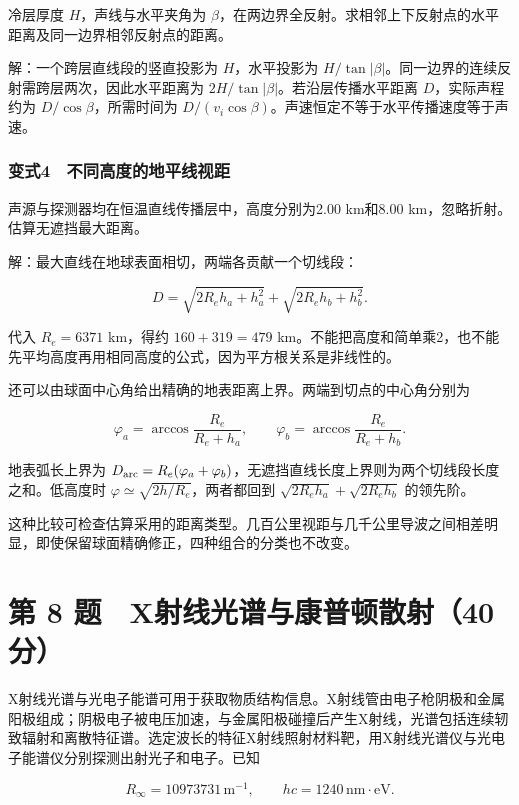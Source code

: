 \documentclass[12pt,a4paper,fontset=fandol]{ctexart}
\begin{document}
冷层厚度 \(H\)，声线与水平夹角为
\(\beta\)，在两边界全反射。求相邻上下反射点的水平距离及同一边界相邻反射点的距离。

解：一个跨层直线段的竖直投影为 \(H\)，水平投影为
\(H/\tan|\beta|\)。同一边界的连续反射需跨层两次，因此水平距离为
\(2H/\tan|\beta|\)。若沿层传播水平距离 \(D\)，实际声程约为
\(D/\cos\beta\)，所需时间为
\(D/(v_i\cos\beta)\)。声速恒定不等于水平传播速度等于声速。

\subsubsection{变式4　不同高度的地平线视距}\label{ux53d8ux5f0f4-ux4e0dux540cux9ad8ux5ea6ux7684ux5730ux5e73ux7ebfux89c6ux8ddd}

声源与探测器均在恒温直线传播层中，高度分别为2.00 km和8.00
km，忽略折射。估算无遮挡最大距离。

解：最大直线在地球表面相切，两端各贡献一个切线段：

\[D=\sqrt{2R_eh_a+h_a^2}+\sqrt{2R_eh_b+h_b^2}.\]

代入 \(R_e=6371\) km，得约 \(160+319=479\)
km。不能把高度和简单乘2，也不能先平均高度再用相同高度的公式，因为平方根关系是非线性的。

还可以由球面中心角给出精确的地表距离上界。两端到切点的中心角分别为

\[\varphi_a=\arccos\frac{R_e}{R_e+h_a},\qquad
\varphi_b=\arccos\frac{R_e}{R_e+h_b}.\]

地表弧长上界为
\(D_{\rm arc}=R_e(\varphi_a+\varphi_b)\)，无遮挡直线长度上界则为两个切线段长度之和。低高度时
\(\varphi\simeq\sqrt{2h/R_e}\)，两者都回到
\(\sqrt{2R_eh_a}+\sqrt{2R_eh_b}\) 的领先阶。

这种比较可检查估算采用的距离类型。几百公里视距与几千公里导波之间相差明显，即使保留球面精确修正，四种组合的分类也不改变。

\clearpage

\section{第 8
题　X射线光谱与康普顿散射（40分）}\label{ux7b2c-8-ux9898-xux5c04ux7ebfux5149ux8c31ux4e0eux5eb7ux666eux987fux6563ux5c0440ux5206}

X射线光谱与光电子能谱可用于获取物质结构信息。X射线管由电子枪阴极和金属阳极组成；阴极电子被电压加速，与金属阳极碰撞后产生X射线，光谱包括连续轫致辐射和离散特征谱。选定波长的特征X射线照射材料靶，用X射线光谱仪与光电子能谱仪分别探测出射光子和电子。已知

\[R_\infty=10973731\,\mathrm{m^{-1}},\qquad
hc=1240\,\mathrm{nm\cdot eV}.\]
\end{document}
